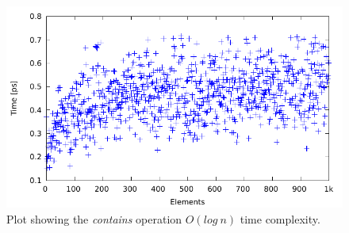 \documentclass{article}
\begin{document}
\begin{figure}
\centering
\includegraphics[width=\linewidth]{contains_outlayers.pdf}
\caption{Plot showing the \textit{contains} operation $O(log~n)$ time complexity.}
\label{fig:contains}
\end{figure}



\end{document}
